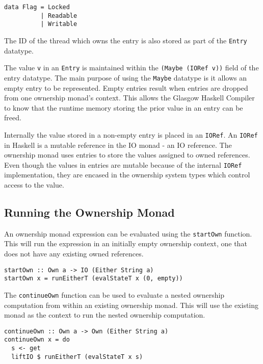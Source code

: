 \documentclass[onehalf,11pt]{beavtex}
\begin{document}
\begin{verbatim}
data Flag = Locked
          | Readable
          | Writable
\end{verbatim}

The ID of the thread which owns the entry is also stored as part of the
\texttt{Entry} datatype. 

The value \texttt{v} in an \texttt{Entry} is maintained within the
\texttt{(Maybe (IORef v))} field of the entry datatype.
The main purpose of using the \texttt{Maybe} datatype is it allows an empty entry
to be represented.
Empty entries result when entries are dropped from one ownership monad's
context.  This allows the Glasgow Haskell Compiler to know that
the runtime memory storing the prior value in an entry can be freed.

Internally the value stored in a non-empty entry is placed in an \texttt{IORef}.
An \texttt{IORef} in Haskell is a mutable reference in the IO monad - an IO
reference. %
The ownership monad uses entries to store the values assigned to owned
references.
Even though the values in entries are mutable because of the internal \texttt{IORef}
implementation, they are encased in the ownership system types which control
access to the value.

\subsection{Running the Ownership Monad}

An ownership monad expression can be evaluated using the \texttt{startOwn}
function. This will run the expression in an initially empty ownership context,
one that does not have any existing owned references. 

\begin{verbatim}
startOwn :: Own a -> IO (Either String a)
startOwn x = runEitherT (evalStateT x (0, empty))
\end{verbatim}


The \texttt{continueOwn} function can be used to evaluate a nested ownership
computation from within an existing ownership monad.  This will use the
existing monad as the context to run the nested ownership computation. 

\begin{verbatim}
continueOwn :: Own a -> Own (Either String a)
continueOwn x = do
  s <- get
  liftIO $ runEitherT (evalStateT x s)
\end{verbatim}
\end{document}
